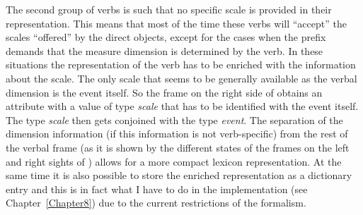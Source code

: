 The second group of verbs is such that no specific scale is provided in their representation. This means that most of the time these verbs will ``accept'' the scales ``offered'' by the direct objects, except for the cases when the prefix demands that the measure dimension is determined by the verb. In these situations the representation of the verb has to be enriched with the information about the scale. The only scale that seems to be generally available as the verbal dimension is the event itself. So the frame on the right side of  obtains an attribute {\scshape\VERBDIM} with a value of type \textit{scale} that has to be identified with the event itself. The type \textit{scale} then gets conjoined with the type \textit{event}. The separation of the dimension information (if this information is not verb-specific) from the rest of the verbal frame (as it is shown by the different states of the frames on the left and right sights of ) allows for a more compact lexicon representation. At the same time it is also possible to store the enriched representation as a dictionary entry and this is in fact what I have to do in the implementation (see Chapter~\ref{Chapter8}) due to the current restrictions of the formalism. 
 


